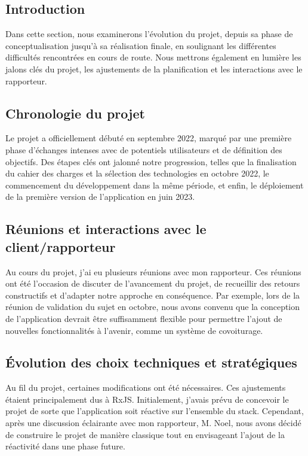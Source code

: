 \subsection{Introduction}\label{subsec:introduction2}
Dans cette section, nous examinerons l'évolution du projet, depuis sa phase de conceptualisation jusqu'à sa réalisation finale, en soulignant les différentes difficultés rencontrées en cours de route.
Nous mettrons également en lumière les jalons clés du projet, les ajustements de la planification et les interactions avec le rapporteur.

\subsection{Chronologie du projet}\label{subsec:chronologie-du-projet}
Le projet a officiellement débuté en septembre 2022, marqué par une première phase d'échanges intenses avec de potentiels utilisateurs et de définition des objectifs.
Des étapes clés ont jalonné notre progression, telles que la finalisation du cahier des charges et la sélection des technologies en octobre 2022,
le commencement du développement dans la même période, et enfin, le déploiement de la première version de l'application en juin 2023.\\

\subsection{Réunions et interactions avec le client/rapporteur}\label{subsec:reunions-et-interactions-avec-le-client/rapporteur}
Au cours du projet, j'ai eu plusieurs réunions avec mon rapporteur.
Ces réunions ont été l'occasion de discuter de l'avancement du projet, de recueillir des retours constructifs et d'adapter notre approche en conséquence.
Par exemple, lors de la réunion de validation du sujet en octobre, nous avons convenu que la conception de l'application
devrait être suffisamment flexible pour permettre l'ajout de nouvelles fonctionnalités à l'avenir, comme un système de covoiturage.\\

\subsection{Évolution des choix techniques et stratégiques}\label{subsec:evolution-des-choix-techniques-et-strategiques}
Au fil du projet, certaines modifications ont été nécessaires.
Ces ajustements étaient principalement dus à RxJS. Initialement, j'avais prévu de concevoir le projet de sorte que l'application soit réactive sur l'ensemble du stack.
Cependant, après une discussion éclairante avec mon rapporteur, M. Noel,
nous avons décidé de construire le projet de manière classique tout en envisageant l'ajout de la réactivité dans une phase future.

